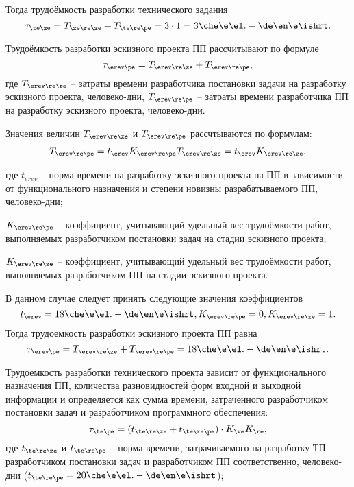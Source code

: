Тогда трудоёмкость разработки технического задания
\begin{equation}
	\tau_{\te\ze} = T_{\ze\re\ze} + T_{\te\re\pe} = 3 \cdot 1 = 3 \che\e\el.-\de\en\e\ishrt.
\end{equation}

Трудоёмкость разработки эскизного проекта ПП рассчитывают по формуле
\begin{equation}
	\tau_{\erev\pe} = T_{\erev\re\ze} + T_{\erev\re\pe},
\end{equation}
где $T_{\erev\re\ze}$ -- затраты времени разработчика постановки задачи на разработку эскизного проекта, человеко-дни, $T_{\erev\re\pe}$ -- затраты времени разработчика ПП на разработку эскизного проекта, человеко-дни.

Значения величин $T_{\erev\re\ze}$ и $T_{\erev\re\pe}$ рассчтываются по формулам:
\begin{eqnarray*}
	T_{\erev\re\pe} = t_{\erev} K_{\erev\re\pe}
	T_{\erev\re\ze} = t_{\erev} K_{\erev\re\ze}, \\
\end{eqnarray*}

где $t_{erev}$ -- норма времени на разработку эскизного проекта на ПП в зависимости от функционального назначения и степени новизны разрабатываемого ПП, человеко-дни;

$K_{\erev\re\pe}$ -- коэффициент, учитывающий удельный вес трудоёмкости работ, выполняемых разработчиком постановки задач на стадии эскизного проекта;

$K_{\erev\re\ze}$ -- коэффициент, учитывающий удельный вес трудоёмкости работ, выполняемых разработчиком ПП на стадии эскизного проекта.

В данном случае следует принять следующие значения коэффициентов
\begin{equation*}
	t_{\erev} = 18 \che\e\el.-\de\en\e\ishrt, K_{\erev\re\pe} = 0, K_{\erev\re\ze} = 1.
\end{equation*}
Тогда трудоемкость разработки эскизного проекта ПП равна
\begin{equation*}
	\tau_{\erev\pe} = T_{\erev\re\ze} + T_{\erev\re\pe} = 18 \che\e\el.-\de\en\e\ishrt.
\end{equation*}

Трудоемкость разработки технического проекта зависит от функционального назначения ПП, количества разновидностей форм входной и выходной информации и определяется как сумма времени, затраченного разработчиком постановки задач и разработчиком программного обеспечения: 
\begin{equation*}
	\tau_{\te\pe} = (t_{\te\re\ze} + t_{\te\re\pe}) \cdot K_{\ve} K_{\re},
\end{equation*}
где $t_{\te\re\ze}$ и $t_{\te\re\pe}$ -- норма времени, затрачиваемого на разработку ТП разработчиком постановки задач и разработчиком ПП соответственно, человеко-дни ($t_{\te\re\pe} = 20\che\e\el.-\de\en\e\ishrt$);

